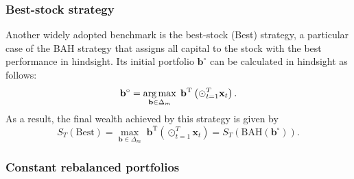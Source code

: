 \subsubsection{Best-stock strategy}

Another widely adopted benchmark is the best-stock (Best) strategy, a particular case of the BAH strategy that assigns all capital to the stock with the best performance in hindsight. Its initial portfolio $\mathbf{b}^\circ$ can be calculated in hindsight as follows:
\begin{equation}
	\mathbf{b}^\circ = \operatorname*{arg\,max}_{\mathbf{b} \in \Delta_m} \; \mathbf{b}^\text{T} \left(\odot_{t=1}^T \mathbf{x}_t\right).
\end{equation}
As a result, the final wealth achieved by this strategy is given by
\begin{equation}
	S_{T}(\mathrm{Best}) = \max_{\mathbf{b} \in \Delta_m} \; \mathbf{b}^\text{T} \left(\odot_{t=1}^T \mathbf{x}_t\right)
	= S_{T}(\mathrm{BAH}(\mathbf{b}^\circ)).
\end{equation}

\subsubsection{Constant rebalanced portfolios}

